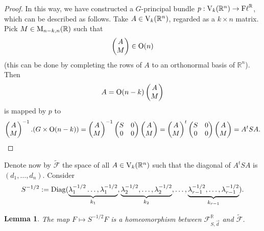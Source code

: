 \documentclass[12pt]{amsart}
\newtheorem{lem}[thm]{Lemma}
\theoremstyle{definition}
\theoremstyle{remark}
\newcommand{\RR}{\mathbb R}
\newcommand{\Fl}{{\mathrm{F\ell}}}
\begin{document}
\begin{proof}
In this way, we have constructed a $G$-principal bundle $p: {\rm V}_k(\RR^n) \to \Fl^\RR$, which can be described as follows.
Take $A\in {\rm V}_k(\RR^n)$, regarded as a $k\times n$ matrix. Pick $M\in {\rm M}_{n-k, n}(\RR)$ such that 
$$\begin{pmatrix}
A  \\
M 
\end{pmatrix}
\in {\rm O}(n)$$
(this can be done by completing the rows of $A$ to an orthonormal basis of $\RR^n$). Then
$$A=
 {\rm O}(n-k) \begin{pmatrix}
A  \\
M 
\end{pmatrix}
$$
is mapped by $p$ to
$$
\begin{pmatrix}
A  \\
M 
\end{pmatrix}^{-1} .(G\times {\rm O}(n-k))
=\begin{pmatrix}
A  \\
M 
\end{pmatrix}^{-1} 
\begin{pmatrix}
S& 0  \\
0 & 0 
\end{pmatrix}
\begin{pmatrix}
A  \\
M 
\end{pmatrix}
=\begin{pmatrix}
A  \\
M 
\end{pmatrix}^{t} 
\begin{pmatrix}
S& 0  \\
0 & 0 
\end{pmatrix}
\begin{pmatrix}
A  \\
M 
\end{pmatrix}
=A^tSA.$$
\end{proof}

Denote now by $\tilde{\mathcal F}$  the space of all $A\in {\rm V}_k(\RR^n)$ such that 
the diagonal of $A^tSA $ is $(d_1,\ldots, d_n)$. Consider 
$$S^{-1/2}:={\rm Diag}(\underbrace{\lambda_1^{-1/2}\dots, \lambda_1^{-1/2}}_{k_1},
\underbrace{\lambda_2^{-1/2}, \dots, \lambda_2^{-1/2}}_{k_2},
\dots,
\underbrace{\lambda_{r-1}^{-1/2}, \dots, \lambda_{r-1}^{-1/2}}_{k_{r-1}}).$$

\begin{lem} \label{lem:homeo} The map $F\mapsto S^{-1/2}F$ is a homeomorphism between ${\mathcal F}_{S, \vec{d}}^\RR$ and $\tilde{\mathcal F}$. 
\end{lem}
\end{document}
